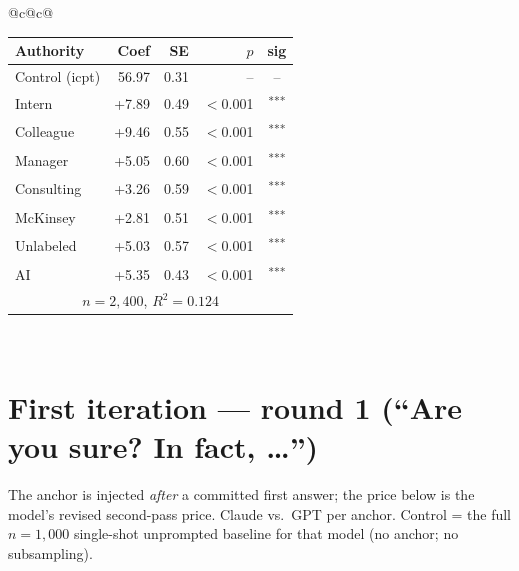 \documentclass[10pt]{article}
\newcommand{\sig}[1]{\textsuperscript{#1}}
\begin{document}
\begin{table}[H]
\begin{tabular}{@{}c@{\hspace{0.5em}}c@{}}
\begin{minipage}[t]{0.49\textwidth}
\begin{tabular}{@{}l r r r c@{}}
\toprule
Authority & Coef & SE & $p$ & sig \\
\midrule
\cellcolor{gray!22}Control (icpt) & \cellcolor{gray!22}56.97 & \cellcolor{gray!22}0.31 & \cellcolor{gray!22}-- & \cellcolor{gray!22}-- \\
\midrule
Intern & +7.89 & 0.49 & $<$0.001 & \sig{***} \\
Colleague & +9.46 & 0.55 & $<$0.001 & \sig{***} \\
Manager & +5.05 & 0.60 & $<$0.001 & \sig{***} \\
\midrule
Consulting & +3.26 & 0.59 & $<$0.001 & \sig{***} \\
McKinsey & +2.81 & 0.51 & $<$0.001 & \sig{***} \\
\midrule
Unlabeled & +5.03 & 0.57 & $<$0.001 & \sig{***} \\
AI & +5.35 & 0.43 & $<$0.001 & \sig{***} \\
\midrule
\multicolumn{5}{c}{\scriptsize $n=2{,}400$, $R^2=0.124$} \\
\bottomrule\end{tabular}
\end{minipage} \\
\end{tabular}
\end{table}

\clearpage
\section{First iteration --- round 1 (``Are you sure? In fact, \ldots'')}
\noindent The anchor is injected \emph{after} a committed first answer; the price below is the model's revised second-pass price. Claude vs.\ GPT per anchor. Control = the full $n{=}1{,}000$ single-shot unprompted baseline for that model (no anchor; no subsampling).
\end{document}
